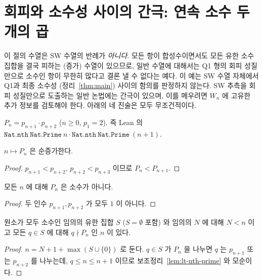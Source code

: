 \section{회피와 소수성 사이의 간극: 연속 소수 두 개의 곱}

이 절의 수열은 SW 수열의 반례가 \emph{아니다}. 모든 항이 합성수이면서도 모든 유한 소수 집합을 결국 피하는
(증가) 수열이 있으므로, 일반 수열에 대해서는 Q1 형의 회피 성질만으로 소수인 항이 무한히 많다고 결론 낼 수 없다는
예다. 이 예는 SW 수열 자체에서 Q1과 최종 소수성 (정리~\ref{thm:main}) 사이의 함의를 판정하지 않는다.
SW 추측을 회피 성질만으로 도출하는 일반 논법에는 간극이 있으며, 이를 메우려면
\(W_n\) 에 고유한 추가 정보를 검토해야 한다. 아래의 네 진술은 모두 무조건적이다.

\begin{definition}[연속 소수 두 개의 곱]
  \label{def:prime-pair-product}
  \leanok
  \(P_n = p_{n+1} \cdot p_{n+2}\) (\(n \ge 0\), \(p_1 = 2\)). 즉 Lean 의
  \(\mathtt{Nat.nth\ Nat.Prime}\ n \cdot \mathtt{Nat.nth\ Nat.Prime}\ (n+1)\).
\end{definition}

\begin{lemma}[\(P\) 는 순증가]
  \label{lem:prime-pair-product-mono}
  \leanok
  \(n \mapsto P_n\) 은 순증가한다.
\end{lemma}
\begin{proof}
  \leanok
  \(p_{n+1} < p_{n+2}\), \(p_{n+2} < p_{n+3}\) 이므로 \(P_n < P_{n+1}\).
\end{proof}

\begin{lemma}[\(P_n\) 은 합성수]
  \label{lem:prime-pair-product-composite}
  \leanok
  모든 \(n\) 에 대해 \(P_n\) 은 소수가 아니다.
\end{lemma}
\begin{proof}
  \leanok
  두 인수 \(p_{n+1}, p_{n+2}\) 가 모두 \(1\) 이 아니다.
\end{proof}

\begin{theorem}
  \label{thm:composite-finite-avoid}
  \leanok
  원소가 모두 소수인 임의의 유한 집합 \(S\) (\(S = \emptyset\) 포함) 와 임의의 \(N\) 에 대해
  \(N < n\) 이고 모든 \(q \in S\) 에 대해 \(q \nmid P_n\) 인 \(n\) 이 있다.
\end{theorem}
\begin{proof}
  \leanok
  \(n = N + 1 + \max(S \cup \{0\})\) 로 둔다. \(q \in S\) 가 \(P_n\) 을 나누면 \(q\) 는 \(p_{n+1}\) 또는
  \(p_{n+2}\) 를 나누는데, \(q \le n \le n + 1\) 이므로 보조정리~\ref{lem:lt-nth-prime} 와 모순이다.
\end{proof}

